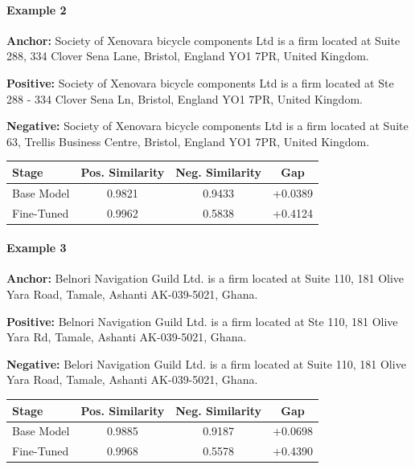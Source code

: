 \documentclass{article}
\begin{document}
\paragraph{Example 2}

\textbf{Anchor:} Society of Xenovara bicycle components Ltd is a firm located at Suite 288, 334 Clover Sena Lane, Bristol, England YO1 7PR, United Kingdom.

\textbf{Positive:} Society of Xenovara bicycle components Ltd is a firm located at Ste 288 - 334 Clover Sena Ln, Bristol, England YO1 7PR, United Kingdom.

\textbf{Negative:} Society of Xenovara bicycle components Ltd is a firm located at Suite 63, Trellis Business Centre, Bristol, England YO1 7PR, United Kingdom.

\begin{center}
\small
\begin{tabular}{lccc}
\toprule
Stage & Pos. Similarity & Neg. Similarity & Gap \\
\midrule
Base Model & 0.9821 & 0.9433 & +0.0389 \\
Fine-Tuned & 0.9962 & 0.5838 & +0.4124 \\
\bottomrule
\end{tabular}
\end{center}

\paragraph{Example 3}

\textbf{Anchor:} Belnori Navigation Guild Ltd. is a firm located at Suite 110, 181 Olive Yara Road, Tamale, Ashanti AK-039-5021, Ghana.

\textbf{Positive:} Belnori Navigation Guild Ltd. is a firm located at Ste 110, 181 Olive Yara Rd, Tamale, Ashanti AK-039-5021, Ghana.

\textbf{Negative:} Belori Navigation Guild Ltd. is a firm located at Suite 110, 181 Olive Yara Road, Tamale, Ashanti AK-039-5021, Ghana.

\begin{center}
\small
\begin{tabular}{lccc}
\toprule
Stage & Pos. Similarity & Neg. Similarity & Gap \\
\midrule
Base Model & 0.9885 & 0.9187 & +0.0698 \\
Fine-Tuned & 0.9968 & 0.5578 & +0.4390 \\
\bottomrule
\end{tabular}
\end{center}
\end{document}
